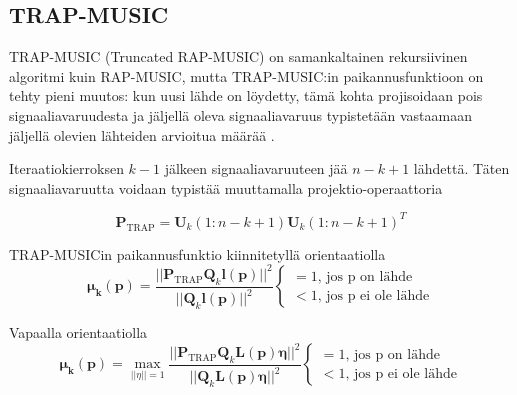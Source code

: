 \subsection{TRAP-MUSIC}
TRAP-MUSIC (Truncated RAP-MUSIC) on samankaltainen rekursiivinen algoritmi kuin RAP-MUSIC, mutta TRAP-MUSIC:in paikannusfunktioon on tehty pieni muutos: kun uusi lähde on löydetty, tämä kohta projisoidaan pois signaaliavaruudesta ja jäljellä oleva signaaliavaruus typistetään vastaamaan jäljellä olevien lähteiden arvioitua määrää \citep{Makela2018TruncatedLocalization}.

Iteraatiokierroksen $k-1$ jälkeen signaaliavaruuteen jää $n-k+1$ lähdettä. Täten signaaliavaruutta voidaan typistää muuttamalla projektio-operaattoria

\begin{equation}
    \mathbf{P}_{\text{TRAP}} = \mathbf{U}_k(1:n-k+1)\mathbf{U}_k(1:n-k+1)^T
\end{equation}

TRAP-MUSICin paikannusfunktio kiinnitetyllä orientaatiolla
\begin{equation}
    \mathbf{\mu_k(p)} = \frac{||\mathbf{P}_{\text{TRAP}}\mathbf{Q}_k\mathbf{l(p)}||^2}{||\mathbf{Q}_k\mathbf{l(p)}||^2}
    \begin{cases}
    =1\text{, jos p on lähde}\\
    <1\text{, jos p ei ole lähde}
     \end{cases}
\end{equation}

Vapaalla orientaatiolla
\begin{equation}
    \mathbf{\mu_k(p)} = \max_{||\eta||=1} \frac{||\mathbf{P}_{\text{TRAP}}\mathbf{Q}_k\mathbf{L(p)\eta}||^2}{||\mathbf{Q}_k\mathbf{L(p)\eta}||^2}
    \begin{cases}
    =1\text{, jos p on lähde}\\
    <1\text{, jos p ei ole lähde}
     \end{cases}
\end{equation}